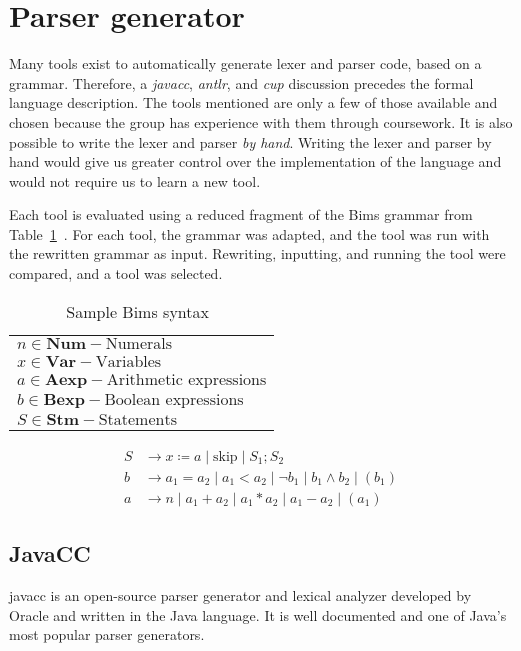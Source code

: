 \section{Parser generator}\label{sec:parsergenerator}
Many tools exist to automatically generate lexer and parser code, based on a grammar. Therefore, a \textit{\gls{javacc}}, \textit{\gls{antlr}}, and \textit{\gls{cup}} discussion precedes the formal language description. The tools mentioned are only a few of those available and chosen because the group has experience with them through coursework. It is also possible to write the lexer and parser \textit{by hand}. Writing the lexer and parser by hand would give us greater control over the implementation of the language and would not require us to learn a new tool.

Each tool is evaluated using a reduced fragment of the Bims grammar from Table~\ref{tab:bimsgrammar}~\cite{Huttel2010}. For each tool, the grammar was adapted, and the tool was run with the rewritten grammar as input. Rewriting, inputting, and running the tool were compared, and a tool was selected.



\begin{table}[htb!]
  \centering
  \begin{tabular}{l}
    $n \in \textbf{Num} - \text{Numerals}$                \\
    $x \in \textbf{Var} - \text{Variables}$               \\
    $a \in \textbf{Aexp} - \text{Arithmetic expressions}$ \\
    $b \in \textbf{Bexp} - \text{Boolean expressions}$    \\
    $S \in \textbf{Stm} - \text{Statements}$              \\
  \end{tabular}
  \begin{align*}
    S & \rightarrow x \coloneqq a \mid \text{skip} \mid S_1;S_2                          \\
    b & \rightarrow a_1 = a_2 \mid a_1 < a_2 \mid \neg b_1 \mid b_1 \land b_2 \mid (b_1) \\
    a & \rightarrow n \mid a_1 + a_2 \mid a_1 * a_2 \mid a_1 - a_2 \mid (a_1)
  \end{align*}
  \caption{Sample Bims syntax~\cite{Huttel2010}}
  \label{tab:bimsgrammar}
\end{table}


\subsection{JavaCC}
\gls{javacc} is an open-source parser generator and lexical analyzer developed by Oracle and written in the Java language. It is well documented and one of Java's most popular parser generators.

